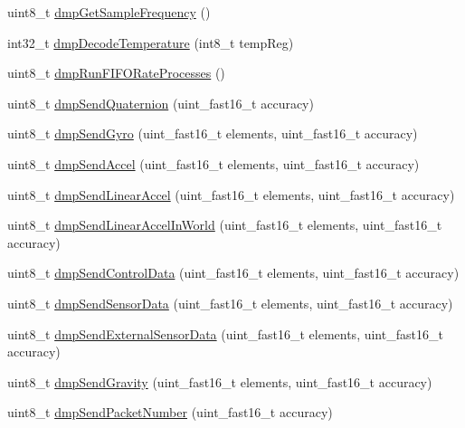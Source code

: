 \begin{DoxyCompactItemize}
\item 
uint8\+\_\+t \mbox{\hyperlink{classMPU6050_a88b471672ecfe54e46868ab985d8d82b}{dmp\+Get\+Sample\+Frequency}} ()
\item 
int32\+\_\+t \mbox{\hyperlink{classMPU6050_ae15d6ac608ea2f4758aecd3a884e6014}{dmp\+Decode\+Temperature}} (int8\+\_\+t temp\+Reg)
\item 
uint8\+\_\+t \mbox{\hyperlink{classMPU6050_ab3e86446b6ac00436727db482069a5e5}{dmp\+Run\+F\+I\+F\+O\+Rate\+Processes}} ()
\item 
uint8\+\_\+t \mbox{\hyperlink{classMPU6050_ac0f184549296f18d3f5a84a1a0e14be2}{dmp\+Send\+Quaternion}} (uint\+\_\+fast16\+\_\+t accuracy)
\item 
uint8\+\_\+t \mbox{\hyperlink{classMPU6050_a5bc20cd1bebc38fe074e5c0671e5eeef}{dmp\+Send\+Gyro}} (uint\+\_\+fast16\+\_\+t elements, uint\+\_\+fast16\+\_\+t accuracy)
\item 
uint8\+\_\+t \mbox{\hyperlink{classMPU6050_ab9257a8106b4235be0653dd3d1a0fceb}{dmp\+Send\+Accel}} (uint\+\_\+fast16\+\_\+t elements, uint\+\_\+fast16\+\_\+t accuracy)
\item 
uint8\+\_\+t \mbox{\hyperlink{classMPU6050_a4a82e600909d259280493cd83e0ee771}{dmp\+Send\+Linear\+Accel}} (uint\+\_\+fast16\+\_\+t elements, uint\+\_\+fast16\+\_\+t accuracy)
\item 
uint8\+\_\+t \mbox{\hyperlink{classMPU6050_a05e012b160f512cb48e9c15d6b8abd60}{dmp\+Send\+Linear\+Accel\+In\+World}} (uint\+\_\+fast16\+\_\+t elements, uint\+\_\+fast16\+\_\+t accuracy)
\item 
uint8\+\_\+t \mbox{\hyperlink{classMPU6050_a8e2e01f401333d24d8c6dbcaf069dcac}{dmp\+Send\+Control\+Data}} (uint\+\_\+fast16\+\_\+t elements, uint\+\_\+fast16\+\_\+t accuracy)
\item 
uint8\+\_\+t \mbox{\hyperlink{classMPU6050_a8e34dafaffb307b410cb5411eda30d25}{dmp\+Send\+Sensor\+Data}} (uint\+\_\+fast16\+\_\+t elements, uint\+\_\+fast16\+\_\+t accuracy)
\item 
uint8\+\_\+t \mbox{\hyperlink{classMPU6050_a9ab7129881263e634dee0d3b0ca802c4}{dmp\+Send\+External\+Sensor\+Data}} (uint\+\_\+fast16\+\_\+t elements, uint\+\_\+fast16\+\_\+t accuracy)
\item 
uint8\+\_\+t \mbox{\hyperlink{classMPU6050_ad3ac445505589ef21a798f5441f86c7a}{dmp\+Send\+Gravity}} (uint\+\_\+fast16\+\_\+t elements, uint\+\_\+fast16\+\_\+t accuracy)
\item 
uint8\+\_\+t \mbox{\hyperlink{classMPU6050_a92d59a9b70509fec913f86e3ba2788e1}{dmp\+Send\+Packet\+Number}} (uint\+\_\+fast16\+\_\+t accuracy)

\end{DoxyCompactItemize}
